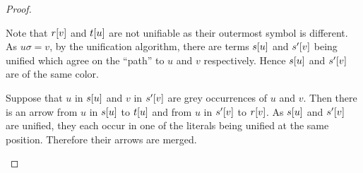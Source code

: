 \documentclass[,%
	paper=a4,%
	DIV10, %
	twoside=false,%
	liststotoc,
	bibtotoc,
	draft=false,%
	numbers=noendperiod
]{scrartcl}
\begin{document}
\begin{proof}
\begin{itemize}
			Note that $r[v]$ and $t[u]$ are not unifiable as their outermost symbol is different.
			As $u\sigma = v$, by the unification algorithm, there are terms $s[u]$ and $s'[v]$ being unified which agree on the ``path'' to $u$ and $v$ respectively.
			Hence $s[u]$ and $s'[v]$ are of the same color.


			Suppose that $u$ in $s[u]$ and $v$ in $s'[v]$ are grey occurrences of $u$ and $v$.
			Then there is an arrow from $u$ in $s[u]$ to $t[u]$ and from $u$ in $s'[v]$ to $r[v]$. 
			As $s[u]$ and $s'[v]$ are unified, they each occur in one of the literals being unified at the same position.
			Therefore their arrows are merged.
	\end{itemize}
\end{proof}
\end{document}
